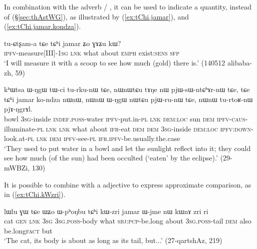 In combination with the adverb  / , it can be used to indicate a quantity, instead of  (§\ref{sec:thAstWG}), as illustrated by (\ref{ex:tChi.jamar}), and (\ref{ex:tChi.jamar.kondza}).

\begin{exe}
\ex \label{ex:tChi.jamar}
\gll tu-ɕtʂam-a tɕe tɕʰi jamar ʑo ɣɤʑu kɯ? \\
\textsc{ipfv}-measure[III]-\textsc{1sg} \textsc{lnk} what about \textsc{emph} exist:\textsc{sens} \textsc{sfp} \\
\glt `I will measure it with a scoop to see how much (gold) there is.' (140512 alibaba-zh, 59)
\end{exe}  

\begin{exe}
\ex \label{ex:tChi.jamar.kondza}
\gll kʰɯtsa ɯ-ŋgɯ tɯ-ci tu-rku-nɯ tɕe, nɯnɯtɕu tɤŋe nɯ pjɯ-sɯ-ntɕʰɤr-nɯ tɕe, tɕe tɕʰi jamar ko-ndza nɯnɯ, nɯnɯ ɯ-ŋgɯ nɯtɕu pjɯ-ru-nɯ tɕe,  nɯnɯ tu-rtoʁ-nɯ pjɤ-ŋgrɤl.   \\
bowl \textsc{3sg}-inside \textsc{indef}.\textsc{poss}-water \textsc{ipfv}-put.in-\textsc{pl} \textsc{lnk} \textsc{dem}:\textsc{loc} sun \textsc{dem} \textsc{ipfv}-\textsc{caus}-illuminate-\textsc{pl} \textsc{lnk} \textsc{lnk} what about \textsc{ifr}-eat \textsc{dem} \textsc{dem} \textsc{3sg}-inside \textsc{dem}:\textsc{loc} \textsc{ipfv}:\textsc{down}-look.at-\textsc{pl} \textsc{lnk} \textsc{dem} \textsc{ipfv}-see-\textsc{pl} \textsc{ifr}.\textsc{ipfv}-be.usually.the.case \\
\glt `They used to put water in a bowl and let the sunlight reflect into it; they could see how much (of the sun) had been occulted (`eaten' by the eclipse).' (29-mWBZi, 130)
\end{exe}  

It is possible to combine  with a adjective to express approximate comparison, as in (\ref{ex:tChi.kWzri}).

\begin{exe}
\ex \label{ex:tChi.kWzri}
\gll lɯlu ɣɯ tɕe ɯʑo ɯ-pʰoŋbu tɕʰi kɯ-zri jamar ɯ-jme nɯ kɯnɤ zri ri \\
cat \textsc{gen} \textsc{lnk} \textsc{3sg} \textsc{3sg}.\textsc{poss}-body what \textsc{sbj}:\textsc{pcp}-be.long about \textsc{3sg}.\textsc{poss}-tail \textsc{dem} also be.long\textsc{fact} but \\
\glt `The cat, its body is about as long as its tail, but...' (27-qartshAz, 219)
\end{exe}  


